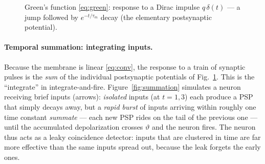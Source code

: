 \documentclass[11pt]{article}
\begin{document}
\begin{figure}[h]
\centering
{}
\caption{Green's function \eqref{eq:green}: response to a Dirac impulse $q\,\delta(t)$ --- a jump
followed by $e^{-t/\tau_m}$ decay (the elementary postsynaptic potential).}
\label{fig:epsp}
\end{figure}

\paragraph{Temporal summation: integrating inputs.}
Because the membrane is linear \eqref{eq:conv}, the response to a train of synaptic pulses is the
\emph{sum} of the individual postsynaptic potentials of Fig.~\ref{fig:epsp}. This is the
``integrate'' in integrate-and-fire. Figure~\ref{fig:summation} simulates a neuron receiving brief
inputs (arrows): \emph{isolated} inputs (at $t=1,3$) each produce a PSP that simply decays away, but
a \emph{rapid burst} of inputs arriving within roughly one time constant \emph{summate} --- each new
PSP rides on the tail of the previous one --- until the accumulated depolarization crosses
$\vartheta$ and the neuron fires. The neuron thus acts as a leaky coincidence detector: inputs that
are clustered in time are far more effective than the same inputs spread out, because the leak
forgets the early ones.
\end{document}
